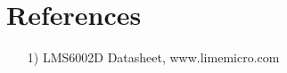 \documentclass{article}
\begin{document}
\begin{flushleft}
	\vspace{15 mm}

\end{flushleft}
\section*{References}
\begin{flushleft}
	\begin{itemize}
		\item[1)] LMS6002D Datasheet, www.limemicro.com
	\end{itemize}
\end{flushleft}
\end{document}
